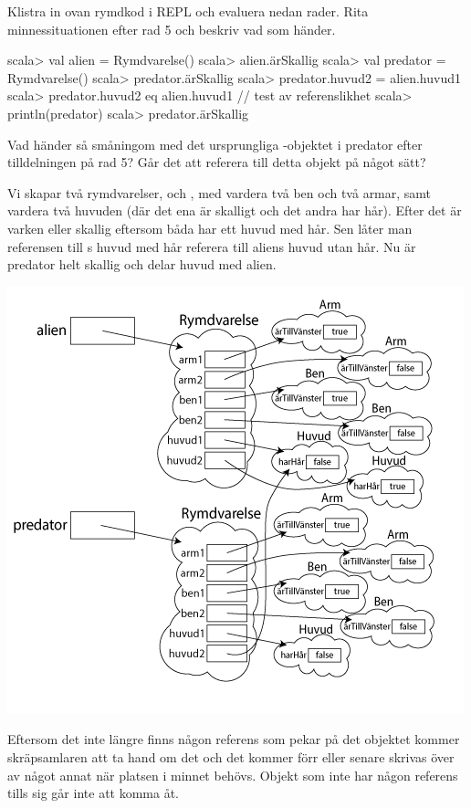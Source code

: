 \Subtask Klistra in ovan rymdkod i REPL och evaluera nedan rader. Rita minnessituationen efter rad 5 och beskriv vad som händer.
\begin{REPL}
scala> val alien = Rymdvarelse()
scala> alien.ärSkallig
scala> val predator = Rymdvarelse()
scala> predator.ärSkallig
scala> predator.huvud2 = alien.huvud1
scala> predator.huvud2 eq alien.huvud1  // test av referenslikhet
scala> println(predator)
scala> predator.ärSkallig
\end{REPL}

\Subtask Vad händer så småningom med det ursprungliga -objektet i predator efter tilldelningen på rad 5? Går det att referera till detta objekt på något sätt?

\SOLUTION

\TaskSolved \what

\SubtaskSolved  Vi skapar två rymdvarelser,  och , med vardera två ben och två armar, samt vardera två huvuden (där det ena är skalligt och det andra har hår). Efter det är varken  eller  skallig eftersom båda har ett huvud med hår. Sen låter man referensen till s huvud med hår referera till aliens huvud utan hår. Nu är predator helt skallig och delar huvud med alien.

\includegraphics[scale=0.65]{../img/w06-solutions/2b}

\SubtaskSolved  Eftersom det inte längre finns någon referens som pekar på det objektet kommer skräpsamlaren att ta hand om det och det kommer förr eller senare skrivas över av något annat när platsen i minnet behövs. Objekt som inte har någon referens tills sig går inte att komma åt.

